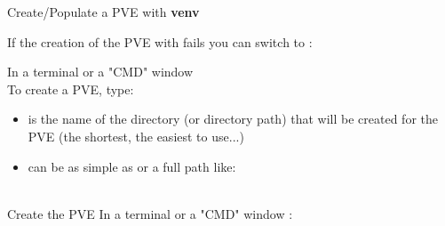 \documentclass[10pt,serif,mathserif,compress,hyperref={colorlinks}]{beamer}
\begin{document}
\begin{frame}{Create/Populate a PVE with \textbf{venv}}

  \hspace*{-8mm} If the creation of the PVE with  fails you can switch to :\smallskip

  
  \begin{tcolorbox}[title={\bf Create a venv PVE}]
    {\footnotesize In a terminal  or a "CMD" window \DarkGray{\footnotesize[Windows]}}\\
    To create a PVE, type: \hspace*{10pt}
    \begin{itemize}
    \item {} is the name of the directory (or directory path) that will be created for the PVE
      (the shortest, the easiest to use...)
    \item {} can be as simple as  or a full path like:\\
      \DarkGray{\footnotesize [Windows]}\hspace*{6mm} \\
       
    \end{itemize}
    
  \end{tcolorbox}

  \begin {bclogo}[noborder=true, couleur=gray!50, couleurBarre=Chocolate, logo=\bctrombone, marge=0, margeG=-.8]
    {Create the  PVE}\smallskip
    In a terminal  or a "CMD" window \DarkGray{\footnotesize[Windows]}:\\
      \hspace*{10pt}
  \end{bclogo}
  
\end{frame}
\end{document}

